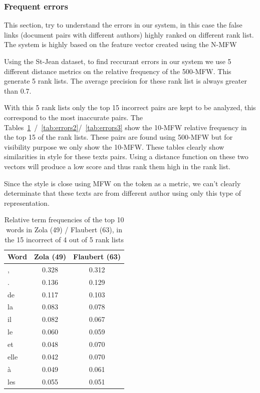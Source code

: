 \subsubsection{Frequent errors}

This section, try to understand the errors in our system, in this case the false links (document pairs with different authors) highly ranked on different rank list.
The system is highly based on the feature vector created using the N-MFW

Using the St-Jean dataset, to find reccurant errors in our system we use 5 different distance metrics on the relative frequency of the 500-MFW.
This generate 5 rank lists.
The average precision for these rank list is always greater than 0.7.

With this 5 rank lists only the top 15 incorrect pairs are kept to be analyzed, this correspond to the most inaccurate pairs.
The Tables~\ref{tab:errors1}~/~\ref{tab:errors2}/~\ref{tab:errors3} show the 10-MFW relative frequency in the top 15 of the rank lists.
These pairs are found using 500-MFW but for visibility purpose we only show the 10-MFW.
These tables clearly show similarities in style for these texts pairs.
Using a distance function on these two vectors will produce a low score and thus rank them high in the rank list.

Since the style is close using MFW on the token as a metric, we can't clearly determinate that these texts are from different author using only this type of representation.

\begin{table}
  \caption{Relative term frequencies of the top 10 words in Zola (49) / Flaubert (63), in the 15 incorrect of 4 out of 5 rank lists}
  \centering
  \label{tab:errors1}
  \begin{tabular}{l c c}
      \toprule
      Word & Zola (49) & Flaubert (63) \\
      \midrule
      , & 0.328 & 0.312 \\
      . & 0.136 & 0.129 \\
      de & 0.117 & 0.103 \\
      la & 0.083 & 0.078 \\
      il & 0.082 & 0.067 \\
      le & 0.060 & 0.059 \\
      et & 0.048 & 0.070 \\
      elle & 0.042 & 0.070 \\
      à & 0.049 & 0.061 \\
      les & 0.055 & 0.051 \\
      \bottomrule
  \end{tabular}
\end{table}

